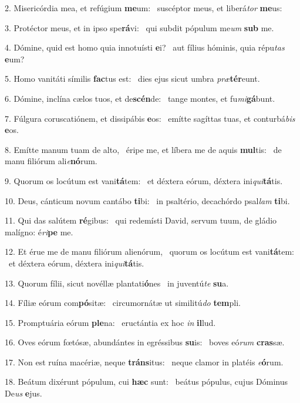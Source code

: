 2. Misericórdia mea, et refúgium \textbf{me}um: \ast\  suscéptor meus, et liberá\textit{tor} \textbf{me}us:\

3. Protéctor meus, et in ipso spe\textbf{rá}vi: \ast\  qui subdit pópulum me\textit{um} \textbf{sub} me.\

4. Dómine, quid est homo quia innotuísti \textbf{e}i? \ast\  aut fílius hóminis, quia répu\textit{tas} \textbf{e}um?\

5. Homo vanitáti símilis \textbf{fac}tus est: \ast\  dies ejus sicut umbra \textit{præ}\textbf{tér}eunt.\

6. Dómine, inclína cælos tuos, et de\textbf{scén}de: \ast\  tange montes, et fu\textit{mi}\textbf{gá}bunt.\

7. Fúlgura coruscatiónem, et dissipábis \textbf{e}os: \ast\  emítte sagíttas tuas, et conturbá\textit{bis} \textbf{e}os.\

8. Emítte manum tuam de alto, \dag\  éripe me, et líbera me de aquis \textbf{mul}tis: \ast\  de manu filiórum ali\textit{e}\textbf{nó}rum.\

9. Quorum os locútum est vani\textbf{tá}tem: \ast\  et déxtera eórum, déxtera ini\textit{qui}\textbf{tá}tis.\

10. Deus, cánticum novum cantábo \textbf{ti}bi: \ast\  in psaltério, decachórdo psal\textit{lam} \textbf{ti}bi.\

11. Qui das salútem \textbf{ré}gibus: \ast\  qui redemísti David, servum tuum, de gládio malígno: é\textit{ri}\textbf{pe} me.\

12. Et érue me de manu filiórum alienórum, \dag\  quorum os locútum est vani\textbf{tá}tem: \ast\  et déxtera eórum, déxtera ini\textit{qui}\textbf{tá}tis.\

13. Quorum fílii, sicut novéllæ plantati\textbf{ó}nes \ast\  in juventú\textit{te} \textbf{su}a.\

14. Fíliæ eórum com\textbf{pó}sitæ: \ast\  circumornátæ ut similitú\textit{do} \textbf{tem}pli.\

15. Promptuária eórum \textbf{ple}na: \ast\  eructántia ex hoc \textit{in} \textbf{il}lud.\

16. Oves eórum fœtósæ, abundántes in egréssibus \textbf{su}is: \ast\  boves eó\textit{rum} \textbf{cras}sæ.\

17. Non est ruína macériæ, neque \textbf{tráns}itus: \ast\  neque clamor in platéis \textit{e}\textbf{ó}rum.\

18. Beátum dixérunt pópulum, cui \textbf{hæc} sunt: \ast\  beátus pópulus, cujus Dóminus De\textit{us} \textbf{e}jus.\

